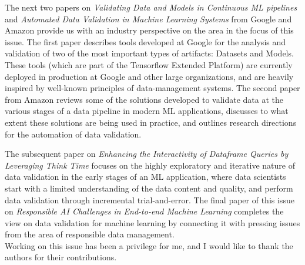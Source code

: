 \documentclass[11pt]{article}
\begin{document}
The next two papers on \textit{Validating Data and Models in Continuous ML pipelines} and \textit{Automated Data Validation in Machine Learning Systems} from Google and Amazon provide us with an industry perspective on the area in the focus of this issue. The first paper describes tools developed at Google for the analysis and validation of two of the most important types of artifacts: Datasets and Models. These tools (which are part of the Tensorflow Extended Platform) are currently deployed in production at Google and other large organizations, and are heavily inspired by well-known principles of data-management systems. The second paper from Amazon reviews some of the solutions developed to validate data at the various stages of a data pipeline in modern ML applications, discusses to what extent these solutions are being used in practice, and outlines research directions for the automation of data validation.

The subsequent paper on \textit{Enhancing the Interactivity of Dataframe Queries by Leveraging Think Time} focuses on the highly exploratory and iterative nature of data validation in the early stages of an ML application, where data scientists start with a limited understanding of the data content and quality, and perform data validation through incremental trial-and-error. The final paper of this issue on \textit{Responsible AI Challenges in End-to-end Machine Learning} completes the view on data validation for machine learning by connecting it with pressing issues from the area of responsible data management.\\ 

Working on this issue has been a privilege for me, and I would like to thank the authors for their  contributions.
\end{document}
